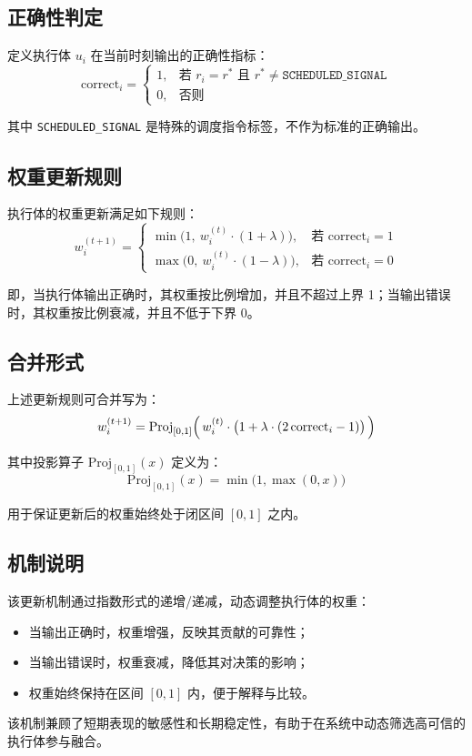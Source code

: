 \documentclass{article}
\begin{document}
\subsection*{正确性判定}

定义执行体 \( u_i \) 在当前时刻输出的正确性指标：
\[
\mathrm{correct}_i =
\begin{cases}
1, & \text{若 } r_i = r^* \text{ 且 } r^* \neq \texttt{SCHEDULED\_SIGNAL} \\[8pt]
0, & \text{否则}
\end{cases}
\]

其中 \texttt{SCHEDULED\_SIGNAL} 是特殊的调度指令标签，不作为标准的正确输出。

\subsection*{权重更新规则}

执行体的权重更新满足如下规则：
\[
w_i^{(t+1)} =
\begin{cases}
\min\bigl(1, \ w_i^{(t)} \cdot (1+\lambda) \bigr), & \text{若 } \mathrm{correct}_i = 1 \\[10pt]
\max\bigl(0, \ w_i^{(t)} \cdot (1-\lambda) \bigr), & \text{若 } \mathrm{correct}_i = 0
\end{cases}
\]

即，当执行体输出正确时，其权重按比例增加，并且不超过上界 1；当输出错误时，其权重按比例衰减，并且不低于下界 0。

\subsection*{合并形式}

上述更新规则可合并写为：
\[
w_i^{(t+1)} =
\mathrm{Proj}_{[0,1]} \Bigl( \, w_i^{(t)} \cdot \bigl( 1 + \lambda \cdot (2\, \mathrm{correct}_i -1) \bigr) \, \Bigr)
\]

其中投影算子 \(\mathrm{Proj}_{[0,1]}(x)\) 定义为：
\[
\mathrm{Proj}_{[0,1]}(x) =
\min\bigl(1, \max(0, x) \bigr)
\]

用于保证更新后的权重始终处于闭区间 \([0,1]\) 之内。

\subsection*{机制说明}

该更新机制通过指数形式的递增/递减，动态调整执行体的权重：
\begin{itemize}
  \item 当输出正确时，权重增强，反映其贡献的可靠性；
  \item 当输出错误时，权重衰减，降低其对决策的影响；
  \item 权重始终保持在区间 \([0,1]\) 内，便于解释与比较。
\end{itemize}

该机制兼顾了短期表现的敏感性和长期稳定性，有助于在系统中动态筛选高可信的执行体参与融合。
\end{document}
